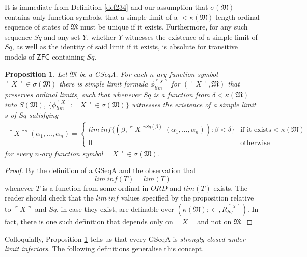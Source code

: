 \documentclass[12pt, twoside]{memoir}
\numberwithin{equation}{section}
\newtheorem{prop}[thm]{Proposition}
\theoremstyle{definition}
\theoremstyle{remark}
\theoremstyle{definition}
\theoremstyle{definition}
\theoremstyle{definition}
\theoremstyle{remark}
\begin{document}
It is immediate from Definition \ref{def234} and our assumption that $\sigma(\mathfrak{M})$ contains only function symbols, that a simple limit of a $< \kappa(\mathfrak{M})$-length ordinal sequence of states of $\mathfrak{M}$ must be unique if it exists. Furthermore, for any such sequence $Sq$ and any set $Y$, whether $Y$ witnesses the existence of a simple limit of $Sq$, as well as the identity of said limit if it exists, is absolute for transitive models of $\mathsf{ZFC}$ containing $Sq$.

\begin{prop}\label{prop233}
Let $\mathfrak{M}$ be a GSeqA. For each $n$-ary function symbol $\ulcorner X \urcorner \in \sigma(\mathfrak{M})$ there is simple limit formula $\phi_{lim}^{\ulcorner X \urcorner}$ for $(\ulcorner X \urcorner, \mathfrak{M})$ that preserves ordinal limits, such that whenever $Sq$ is a function from $\delta < \kappa(\mathfrak{M})$ into $S(\mathfrak{M})$, $\{\phi_{lim}^{\ulcorner X \urcorner} : \ulcorner X \urcorner \in \sigma(\mathfrak{M})\}$ witnesses the existence of a simple limit $s$ of $Sq$ satisfying 
\begin{gather*}
    \ulcorner X \urcorner^{s} (\alpha_1, ..., \alpha_n) = 
    \begin{cases}
        lim \ inf \{(\beta, \ulcorner X \urcorner^{Sq(\beta)}(\alpha_1, ..., \alpha_n)) : \beta < \delta\} & \!\!\!\! \text{if it exists} < \kappa(\mathfrak{M}) \\
        0 & \!\!\!\! \text{otherwise}
    \end{cases} 
\end{gather*}
for every $n$-ary function symbol $\ulcorner X \urcorner \in \sigma(\mathfrak{M})$.
\end{prop}

\begin{proof}
By the definition of a GSeqA and the observation that 
\begin{equation*}
    lim \ inf (T) = lim (T)
\end{equation*}
whenever $T$ is a function from some ordinal in $ORD$ and $lim (T)$ exists. The reader should check that the $lim \ inf$ values specified by the proposition relative to $\ulcorner X \urcorner$ and $Sq$, in case they exist, are definable over $(\kappa(\mathfrak{M}); \in, R_{Sq}^{\ulcorner X \urcorner})$. In fact, there is one such definition that depends only on $\ulcorner X \urcorner$ and not on $\mathfrak{M}$.
\end{proof}

Colloquially, Proposition \ref{prop233} tells us that every GSeqA is \emph{strongly closed under limit inferiors}. The following definitions generalise this concept.
\end{document}
